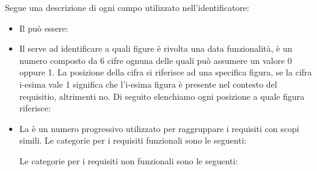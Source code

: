 \noindent
Segue una descrizione di ogni campo utilizzato nell'identificatore:
\begin{itemize}
	\item Il  può essere:

	\item Il  serve ad identificare a quali figure è rivolta una data funzionalità, è un numero composto da 6 cifre ognuna delle quali può assumere un valore 0 oppure 1. La posizione della cifra si riferisce ad una specifica figura, se la cifra i-esima vale 1 significa che l'i-esima figura è presente nel contesto del requisitio, altrimenti no.
	Di seguito elenchiamo ogni posizione a quale figura riferisce: 

	\item La  è un numero progressivo utilizzato per raggruppare i requisiti con scopi simili.
	Le categorie per i requisiti funzionali sono le seguenti:
	Le categorie per i requisiti non funzionali sono le seguenti:


\end{itemize}
